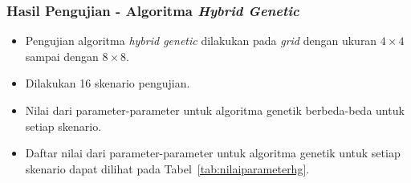 \documentclass{beamer}
\begin{document}
\begin{frame}
\frametitle{Hasil Pengujian - Algoritma \textit{Hybrid Genetic}}
\begin{itemize}
\item Pengujian algoritma \textit{hybrid genetic} dilakukan pada \textit{grid} dengan ukuran \begin{math}4 \times 4\end{math} sampai dengan \begin{math}8 \times 8\end{math}.
\item Dilakukan 16 skenario pengujian.
\item Nilai dari parameter-parameter untuk algoritma genetik berbeda-beda untuk setiap skenario.
\item Daftar nilai dari parameter-parameter untuk algoritma genetik untuk setiap skenario dapat dilihat pada Tabel~\ref{tab:nilaiparameterhg}.
\end{itemize}
\end{frame}

\end{document}
